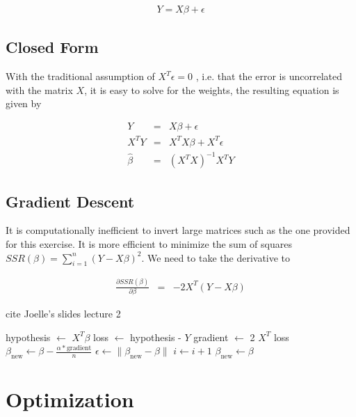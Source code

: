 \documentclass[conference]{IEEEtran}
\begin{document}
\begin{eqnarray}
  Y = X \beta + \epsilon
\end{eqnarray}

\subsection{Closed Form}

With the traditional assumption of $X^T \epsilon = 0$
\cite{davidson2004econometric}, i.e. that the error is 
uncorrelated with the matrix $X$, it is easy to solve for the weights, the
resulting equation is given by

\begin{eqnarray}
  Y &=& X \beta + \epsilon \\
  X^T Y &=& X^T X \beta + X^T \epsilon \\
  \hat{\beta} &=& (X^TX)^{-1}X^TY 
\end{eqnarray}


\subsection{Gradient Descent}

It is computationally inefficient to invert large matrices such as the one
provided for this exercise. It is more efficient to minimize the sum of squares
$SSR(\beta) = \sum_{i=1}^n (Y-X \beta)^2$. We need to take the derivative to 

\begin{eqnarray}
  \frac{\partial SSR(\beta)}{\partial \beta} &=& -2 X^T (Y-X \beta)
\end{eqnarray}

cite Joelle's slides lecture 2

\begin{algorithmic}
    \State hypothesis $\leftarrow$ $X^T \beta$
    \State loss $\leftarrow$ hypothesis - $Y$
    \State gradient $\leftarrow$ 2 $X^T$ loss
    \State $\beta_{\text{new}} \leftarrow \beta - \frac{\alpha *
      \text{gradient}}{n}$  
    \State $\epsilon \leftarrow \| \beta_{\text{new}} - \beta \| $ 
    \State $i \leftarrow i + 1$
    \State $\beta_{\text{new}} \leftarrow \beta$
\EndWhile
\end{algorithmic}

\section{Optimization}
\end{document}
